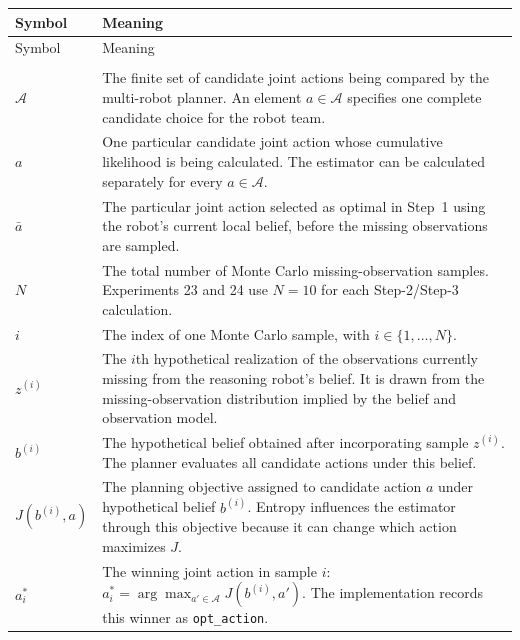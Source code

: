\documentclass[11pt,a4paper]{article}
\begin{document}
\begin{longtable}{>{\raggedright\arraybackslash}p{}
                  >{\raggedright\arraybackslash}p{}}
\toprule
Symbol & Meaning \\
\midrule
\endfirsthead
\toprule
Symbol & Meaning \\
\midrule
\endhead
\midrule
\multicolumn{2}{r}{\small Continued on the next page}\\
\endfoot
\bottomrule
\endlastfoot
$\mathcal A$ & The finite set of candidate joint actions being compared by the multi-robot planner.  An element $a\in\mathcal A$ specifies one complete candidate choice for the robot team. \\

$a$ & One particular candidate joint action whose cumulative likelihood is being calculated.  The estimator can be calculated separately for every $a\in\mathcal A$. \\

$\bar a$ & The particular joint action selected as optimal in Step~1 using the robot's current local belief, before the missing observations are sampled. \\

$N$ & The total number of Monte Carlo missing-observation samples.  Experiments 23 and 24 use $N=10$ for each Step-2/Step-3 calculation. \\

$i$ & The index of one Monte Carlo sample, with $i\in\{1,\ldots,N\}$. \\

$z^{(i)}$ & The $i$th hypothetical realization of the observations currently missing from the reasoning robot's belief.  It is drawn from the missing-observation distribution implied by the belief and observation model. \\

$b^{(i)}$ & The hypothetical belief obtained after incorporating sample $z^{(i)}$.  The planner evaluates all candidate actions under this belief. \\

$J(b^{(i)},a)$ & The planning objective assigned to candidate action $a$ under hypothetical belief $b^{(i)}$.  Entropy influences the estimator through this objective because it can change which action maximizes $J$. \\

$a_i^*$ & The winning joint action in sample $i$: $a_i^*=\arg\max_{a'\in\mathcal A}J(b^{(i)},a')$.  The implementation records this winner as \texttt{opt\_action}. \\


\end{longtable}
\end{document}
